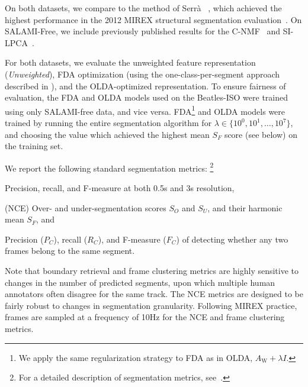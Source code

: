 \documentclass{article}
\begin{document}
On both datasets, we compare to the method of Serr\`{a} \etal~\cite{serra2012unsupervised}, which achieved the
highest performance in the 2012 MIREX structural segmentation evaluation~\cite{Downie2008}.
On SALAMI-Free, we include previously published results for the C-NMF~\cite{nieto2013convex} and SI-LPCA~\cite{weiss2011unsupervised}.

For both datasets, we evaluate the unweighted feature representation (\emph{Unweighted}), FDA optimization (using the
one-class-per-segment approach described in ), and the OLDA-optimized
representation. To ensure fairness of evaluation, the FDA and OLDA models used on the Beatles-ISO were trained using only
SALAMI-free data, and vice versa.  FDA\footnote{We apply the same regularization strategy to FDA as in OLDA, $A_\text{W} + \lambda
I$.} and OLDA models were trained by running the entire segmentation algorithm for
$\lambda \in \{10^0, 10^1, \dots, 10^7\}$, and choosing the value which achieved the highest mean $S_F$ score (see below) on 
the training set.


We report the following standard segmentation metrics:
\footnote{For a detailed description of segmentation metrics, see~\cite{mirexstructure}.}
\begin{description}\addtolength{\itemsep}{-0.25\baselineskip}%
\item[Boundary retrieval] Precision, recall, and F-measure at both 0.5s and 3s resolution,
\item[Normalized conditional entropy] (NCE) Over- and under-segmentation scores $S_O$ and $S_U$, and their harmonic
mean $S_F$, and
\item[Frame clustering] Precision ($P_C$), recall ($R_C$), and F-measure ($F_C$) of detecting whether any two frames 
belong to the same segment.
\end{description}
Note that boundary retrieval and frame clustering metrics are highly sensitive to changes in the number of
predicted segments, upon which multiple human annotators often disagree for the same track. 
The NCE metrics are designed to be fairly robust to changes in segmentation granularity.
Following MIREX practice, frames are sampled at a frequency of 10Hz for the NCE and frame clustering metrics. 
\end{document}
